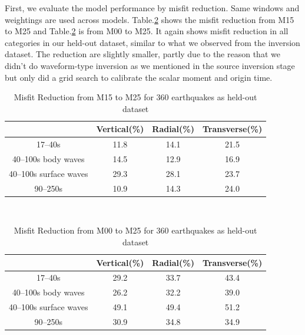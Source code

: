\documentclass[extra,mreferee]{gji}
\begin{document}
First, we evaluate the model performance by misfit reduction. Same windows and
weightings are used across models. Table.\ref{table:misfit_reduction_M00_M25_360}
shows the misfit reduction from M15 to M25 and Table.\ref{table:misfit_reduction_M00_M25_360}
is from M00 to M25. It again shows misfit reduction in all categories in
our held-out dataset, similar to what we observed from the inversion dataset.
The reduction are slightly smaller, partly due to the reason that we didn't
do waveform-type inversion as we mentioned in the source inversion stage but
only did a grid search to calibrate the scalar moment and origin time.

\begin{table}[!htb]
  \centering
  \begin{tabular}{|c|c|c|c|}
  \hline
  ~          &  Vertical(\%) & Radial(\%) &  Transverse(\%) \\
  \hline
  17--40s                &          11.8 &       14.1 &       21.5 \\
  40--100s body waves    &          14.5 &       12.9 &       16.9 \\
  40--100s surface waves &          29.3 &       28.1 &       23.7 \\
  90--250s               &          10.9 &       14.3 &       24.0 \\
  \hline
  \end{tabular}\\
  \caption{Misfit Reduction from M15 to M25 for 360 earthquakes as held-out dataset}
  \label{table:misfit_reduction_M15_M25_360}
\end{table}

\begin{table}[!htb]
  \centering
  \begin{tabular}{|c|c|c|c|}
    \hline
    ~          &  Vertical(\%) & Radial(\%) &  Transverse(\%) \\
    \hline
    17--40s                &         29.2 &       33.7 &       43.4 \\
    40--100s body waves    &         26.2 &       32.2 &       39.0 \\
    40--100s surface waves &         49.1 &       49.4 &       51.2 \\
    90--250s               &         30.9 &       34.8 &       34.9 \\
    \hline
  \end{tabular}\\
  \caption{Misfit Reduction from M00 to M25 for 360 earthquakes as held-out dataset}
  \label{table:misfit_reduction_M00_M25_360}
\end{table}
\end{document}
